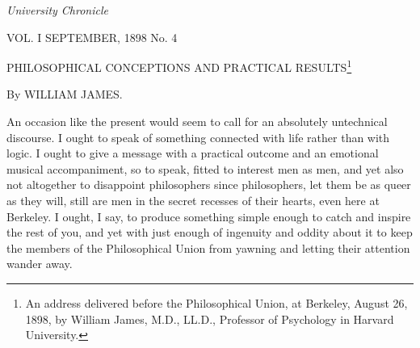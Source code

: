 \documentclass[]{article}
\begin{document}
\setcounter{footnote}{0}

\noindent
\emph{University Chronicle}

\noindent
VOL. I SEPTEMBER, 1898 No. 4 

\noindent
PHILOSOPHICAL CONCEPTIONS AND 
PRACTICAL RESULTS\footnote{An address delivered before the Philosophical Union, at Berkeley, August 26, 1898, by William James, M.D., LL.D., Professor of Psychology in Harvard University.}

\noindent
By WILLIAM JAMES.


\bigskip
{}
An occasion like the present would seem to call for an absolutely untechnical discourse. I ought to speak of something connected with life rather than with logic. I ought to give a message with a practical outcome and an emotional musical accompaniment, so to speak, fitted to interest men as men, and yet also not altogether to disappoint philosophers since philosophers, let them be as queer as they will, still are men in the secret recesses of their hearts, even here at Berkeley. I ought, I say, to produce something simple enough to catch and inspire the rest of you, and yet with just enough of ingenuity and oddity about it to keep the members of the Philosophical Union from yawning and letting their attention wander away. 
\end{document}
